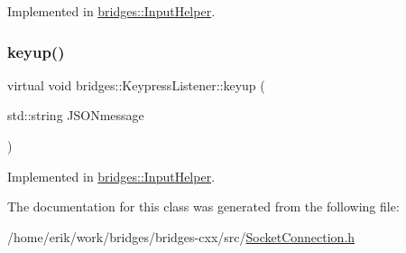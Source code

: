 Implemented in \hyperlink{classbridges_1_1_input_helper_a250df70ebe8470f1cb492c17a69c79d7}{bridges\+::\+Input\+Helper}.

\mbox{\label{classbridges_1_1_keypress_listener_ad5af91d35dc485182056ca821f3ce03e}} 
\subsubsection{\texorpdfstring{keyup()}{keyup()}}
{\footnotesize\ttfamily virtual void bridges\+::\+Keypress\+Listener\+::keyup (\begin{DoxyParamCaption}\item[{std\+::string}]{J\+S\+O\+Nmessage }\end{DoxyParamCaption})\hspace{0.3cm}{\ttfamily [pure virtual]}}



Implemented in \hyperlink{classbridges_1_1_input_helper_a55757d526340d939052cf1dca755262b}{bridges\+::\+Input\+Helper}.



The documentation for this class was generated from the following file\+:\begin{DoxyCompactItemize}
\item 
/home/erik/work/bridges/bridges-\/cxx/src/\hyperlink{_socket_connection_8h}{Socket\+Connection.\+h}\end{DoxyCompactItemize}
